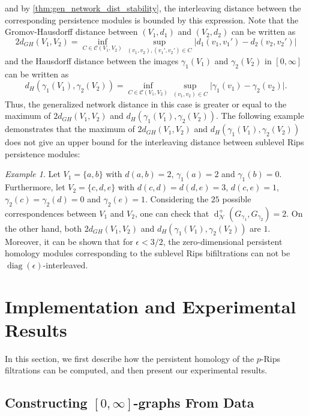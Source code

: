 \documentclass[a4paper,11pt]{article}
\DeclareMathOperator{\diag}{diag}
\newcounter{dummy}\numberwithin{dummy}{section}
\theoremstyle{remark}
\newtheorem{example}[dummy]{Example}
\begin{document}
and by \cref{thm:gen_network_dist_stability}, the interleaving distance between the corresponding persistence modules is bounded by this expression. Note that the Gromov-Hausdorff distance between $(V_1,d_1)$ and $(V_2,d_2)$ can be written as 
\begin{equation*}
2d_{GH}(V_1,V_2)=\inf_{C\in\mathcal{C}(V_1,V_2)}\sup_{(v_1,v_2),(v_1',v_2')\in C}\vert d_1(v_1,v_1')-d_2(v_2,v_2')\vert  
\end{equation*}
and the Hausdorff distance between the images $\gamma_1(V_1)$ and $\gamma_2(V_2)$ in $[0,\infty]$ can be written as 
\begin{equation*}
d_H(\gamma_1(V_1),\gamma_2(V_2))=\inf_{C\in\mathcal{C}(V_1,V_2)}\sup_{(v_1,v_2)\in C}\vert\gamma_1(v_1)-\gamma_2(v_2)\vert.    
\end{equation*}
Thus, the generalized network distance in this case is greater or equal to the maximum of $2d_{GH}(V_1,V_2)$ and $d_H(\gamma_1(V_1),\gamma_2(V_2))$. The following example demonstrates that the maximum of $2d_{GH}(V_1,V_2)$ and $d_H(\gamma_1(V_1),\gamma_2(V_2))$ does not give an upper bound for the interleaving distance between sublevel Rips persistence modules:

\begin{example}
Let $V_1=\{a,b\}$ with $d(a,b)=2$, $\gamma_1(a)=2$ and $\gamma_1(b)=0$. Furthermore, let $V_2=\{c,d,e\}$ with $d(c,d)=d(d,e)=3$, $d(c,e)=1$, $\gamma_2(c)=\gamma_2(d)=0$ and $\gamma_2(e)=1$. Considering the $25$ possible correspondences between $V_1$ and $V_2$, one can check that $\operatorname{d}_{\mathcal{N}}^+(G_{\gamma_1},G_{\gamma_2})=2$. On the other hand, both $2d_{GH}(V_1,V_2)$ and $d_H(\gamma_1(V_1),\gamma_2(V_2))$ are $1$. Moreover, it can be shown that for $\epsilon<3/2$, the zero-dimensional persistent homology modules corresponding to the sublevel Rips bifiltrations can not be $\diag(\epsilon)$-interleaved.
\end{example}

\section{Implementation and Experimental Results}\label{sec:implementation_and_experimental_results}

In this section, we first describe how the persistent homology of the $p$-Rips filtrations can be computed, and then present our experimental results.

\subsection{\texorpdfstring{Constructing $[0,\infty]$-graphs From Data}{Constructing [0,infinity]-graphs From Data}}\label{sec:constructing_p_graphs_from_data}
\end{document}
